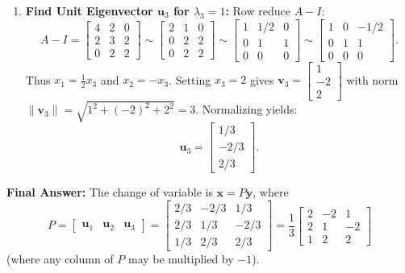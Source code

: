 \documentclass[11pt, letterpaper]{article}
\theoremstyle{definition}
\theoremstyle{remark}
\begin{document}
\begin{enumerate}[label=\textbf{Step \arabic*:}]
\[    \]
    Thus $x_1 = -x_3$ and $x_2 = \frac{1}{2}x_3$. Setting $x_3 = 2$ gives $\mathbf{v}_2 = \begin{bmatrix} -2 \\ 1 \\ 2 \end{bmatrix}$ with norm $\|\mathbf{v}_2\| = \sqrt{(-2)^2 + 1^2 + 2^2} = 3$. Normalizing yields:
    \[
    \mathbf{u}_2 = \begin{bmatrix} -2/3 \\ 1/3 \\ 2/3 \end{bmatrix}.
    \]
    \item \textbf{Find Unit Eigenvector $\mathbf{u}_3$ for $\lambda_3 = 1$:}
    Row reduce $A - I$:
    \[
    A - I = \begin{bmatrix} 4 & 2 & 0 \\ 2 & 3 & 2 \\ 0 & 2 & 2 \end{bmatrix} \sim \begin{bmatrix} 2 & 1 & 0 \\ 0 & 2 & 2 \\ 0 & 2 & 2 \end{bmatrix} \sim \begin{bmatrix} 1 & 1/2 & 0 \\ 0 & 1 & 1 \\ 0 & 0 & 0 \end{bmatrix} \sim \begin{bmatrix} 1 & 0 & -1/2 \\ 0 & 1 & 1 \\ 0 & 0 & 0 \end{bmatrix}.
    \]
    Thus $x_1 = \frac{1}{2}x_3$ and $x_2 = -x_3$. Setting $x_3 = 2$ gives $\mathbf{v}_3 = \begin{bmatrix} 1 \\ -2 \\ 2 \end{bmatrix}$ with norm $\|\mathbf{v}_3\| = \sqrt{1^2 + (-2)^2 + 2^2} = 3$. Normalizing yields:
    \[
    \mathbf{u}_3 = \begin{bmatrix} 1/3 \\ -2/3 \\ 2/3 \end{bmatrix}.
    \]
\end{enumerate}
\textbf{Final Answer:} The change of variable is $\mathbf{x} = P\mathbf{y}$, where
\[
P = \begin{bmatrix} \mathbf{u}_1 & \mathbf{u}_2 & \mathbf{u}_3 \end{bmatrix} = \begin{bmatrix} 2/3 & -2/3 & 1/3 \\ 2/3 & 1/3 & -2/3 \\ 1/3 & 2/3 & 2/3 \end{bmatrix} = \frac{1}{3} \begin{bmatrix} 2 & -2 & 1 \\ 2 & 1 & -2 \\ 1 & 2 & 2 \end{bmatrix}
\]
(where any column of $P$ may be multiplied by $-1$).
\end{document}
